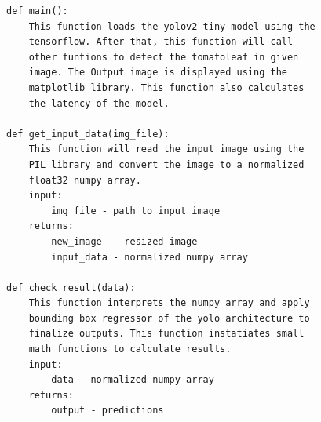 \documentclass[a4paper,12pt,oneside]{book}
\begin{document}
\begin{lstlisting}
def main():
    This function loads the yolov2-tiny model using the 
    tensorflow. After that, this function will call
    other funtions to detect the tomatoleaf in given
    image. The Output image is displayed using the 
    matplotlib library. This function also calculates 
    the latency of the model.

def get_input_data(img_file):
    This function will read the input image using the
    PIL library and convert the image to a normalized
    float32 numpy array.
    input:
        img_file - path to input image
    returns:
        new_image  - resized image
        input_data - normalized numpy array

def check_result(data):
    This function interprets the numpy array and apply 
    bounding box regressor of the yolo architecture to
    finalize outputs. This function instatiates small
    math functions to calculate results.
    input:
        data - normalized numpy array
    returns:
        output - predictions
\end{lstlisting}
\end{document}
